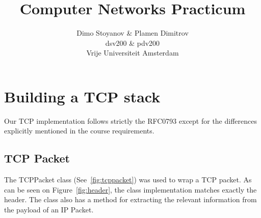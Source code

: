 \documentclass{article}
\title{	\textbf{Computer Networks Practicum}
		}
\author{
		Dimo Stoyanov \& Plamen Dimitrov\\
		dsv200 \& pdv200 \\
		Vrije Universiteit Amsterdam\\	
}
\begin{document}
\maketitle

\section{Building a TCP stack}
Our TCP implementation follows strictly the RFC0793 except for the differences explicitly
mentioned in the course requirements.


\subsection{TCP Packet}
The TCPPacket class (See~\ref{fig:tcppacket}) was used to wrap a TCP packet. As can be seen
on Figure~\ref{fig:header}, the class implementation matches exactly the header. The class
also has a method for extracting the relevant information from the payload of an IP Packet.
\end{document}
